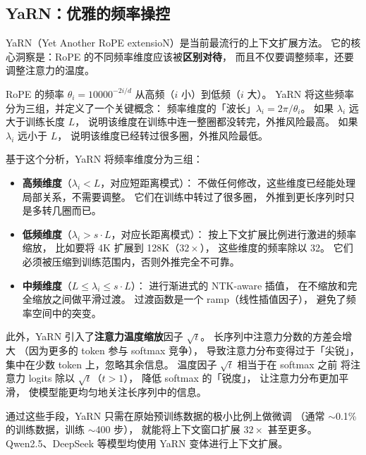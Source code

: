 \subsection{YaRN：优雅的频率操控}

YaRN（Yet Another RoPE extensioN）是当前最流行的上下文扩展方法。
它的核心洞察是：RoPE 的不同频率维度应该被\textbf{区别对待}，
而且不仅要调整频率，还要调整注意力的温度。


RoPE 的频率 $\theta_i = 10000^{-2i/d}$ 从高频（$i$ 小）到低频（$i$ 大）。
YaRN 将这些频率分为三组，并定义了一个关键概念：
频率维度的「波长」$\lambda_i = 2\pi / \theta_i$。
如果 $\lambda_i$ 远大于训练长度 $L$，
说明该维度在训练中连一整圈都没转完，外推风险最高。
如果 $\lambda_i$ 远小于 $L$，
说明该维度已经转过很多圈，外推风险最低。

基于这个分析，YaRN 将频率维度分为三组：
\begin{itemize}[noitemsep]
  \item \textbf{高频维度}（$\lambda_i < L$，对应短距离模式）：
        不做任何修改，这些维度已经能处理局部关系，不需要调整。
        它们在训练中转过了很多圈，
        外推到更长序列时只是多转几圈而已。
  \item \textbf{低频维度}（$\lambda_i > s \cdot L$，对应长距离模式）：
        按上下文扩展比例进行激进的频率缩放，
        比如要将 4K 扩展到 128K（$32\times$），
        这些维度的频率除以 32。
        它们必须被压缩到训练范围内，否则外推完全不可靠。
  \item \textbf{中频维度}（$L \leq \lambda_i \leq s \cdot L$）：
        进行渐进式的 NTK-aware 插值，
        在不缩放和完全缩放之间做平滑过渡。
        过渡函数是一个 ramp（线性插值因子），
        避免了频率空间中的突变。
\end{itemize}

此外，YaRN 引入了\textbf{注意力温度缩放}因子 $\sqrt{t}$。
长序列中注意力分数的方差会增大
（因为更多的 token 参与 softmax 竞争），
导致注意力分布变得过于「尖锐」，
集中在少数 token 上，忽略其余信息。
温度因子 $\sqrt{t}$ 相当于在 softmax 之前
将注意力 logits 除以 $\sqrt{t}$（$t > 1$），
降低 softmax 的「锐度」，
让注意力分布更加平滑，
使模型能更均匀地关注长序列中的信息。

通过这些手段，YaRN 只需在原始预训练数据的极小比例上做微调
（通常 $\sim$0.1\% 的训练数据，训练 $\sim$400 步），
就能将上下文窗口扩展 $32\times$ 甚至更多。
Qwen2.5、DeepSeek 等模型均使用 YaRN 变体进行上下文扩展。

